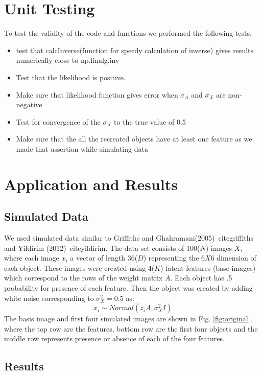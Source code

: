 \documentclass{article}
\begin{document}
\section{Unit Testing}
To test the validity of the code and functions we performed the following tests.

\begin{itemize}
\item{test that calcInverse(function for speedy calculation of inverse) gives results numerically close to np.linalg.inv}
\item{Test that the likelihood is positive.}
\item{Make sure that likelihood function gives error when $\sigma_A$ and $\sigma_X$ are non-negative}
\item{Test for convergence of the $\sigma_X$ to the true value of 0.5}
\item{Make sure that the all the recreated objects have at least one feature as we made that assertion while simulating data}
\end{itemize}

\section{Application and Results}
\subsection{Simulated Data}
We used simulated data similar to Griffiths and Ghahramani(2005)~cite{griffiths} and Yildirim (2012)~cite{yildirim}. The data set consists of 100($N$) images $X$, where each image $x_i$ a vector of length 36($D$) representing the $6X6$ dimension of each object. These images were created using 4($K$) latent features (base images) which correspond to the rows of the weight matrix $A$. Each object has .5 probability for presence of each feature. Then the object was created by adding white noise corresponding to $\sigma_X^2=0.5$ as:
\[
x_i \sim Normal(z_iA, \sigma_X^2I)
\]
The basis image and first four simulated images are shown in Fig. \ref{fig:original}, where the top row are the features, bottom row are the first four objects and the middle row represents presence or absence of each of the four features.\\

\subsection{Results}
\end{document}
